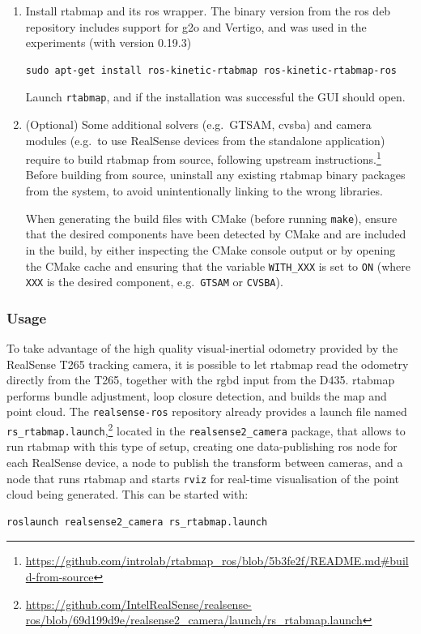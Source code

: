 \documentclass[11pt, letterpaper, twoside]{article}
\begin{document}
\begin{enumerate}
    \item Install \gls{rtabmap} and its \gls{ros} wrapper. The binary version
        from the \gls{ros} deb repository includes support for g2o and Vertigo,
        and was used in the experiments (with version 0.19.3)
\begin{Verbatim}[samepage=true]
    sudo apt-get install ros-kinetic-rtabmap ros-kinetic-rtabmap-ros
\end{Verbatim}

        Launch \texttt{rtabmap}, and if the installation was successful the GUI
        should open.

    \item (Optional) Some additional solvers (e.g.\ GTSAM, cvsba) and camera
        modules (e.g.\ to use RealSense devices from the standalone
        application) require to build \gls{rtabmap} from source, following
        upstream
        instructions.\footnote{\url{https://github.com/introlab/rtabmap_ros/blob/5b3fe2f/README.md\#build-from-source}}
        Before building from source, uninstall any existing \gls{rtabmap}
        binary packages from the system, to avoid unintentionally linking to
        the wrong libraries.

        When generating the build files with CMake (before
        running \texttt{make}), ensure that the desired components have been
        detected by CMake and are included in the build, by either inspecting
        the CMake console output or by opening the CMake cache and ensuring
        that the variable \texttt{WITH\_XXX} is set to \texttt{ON} (where
        \texttt{XXX} is the desired component, e.g.\ \texttt{GTSAM} or
        \texttt{CVSBA}).

\end{enumerate}

\subsubsection{Usage}

To take advantage of the high quality visual-inertial odometry provided by the
RealSense T265 tracking camera, it is possible to let \gls{rtabmap} read the
odometry directly from the T265, together with the \gls{rgbd} input from the
D435. \gls{rtabmap} performs bundle adjustment, loop closure detection, and
builds the map and point cloud. The \texttt{realsense-ros} repository already
provides a launch file named
\texttt{rs\_rtabmap.launch},\footnote{\url{https://github.com/IntelRealSense/realsense-ros/blob/69d199d9e/realsense2_camera/launch/rs_rtabmap.launch}}
located in the \texttt{realsense2\_camera} package, that allows to run
\gls{rtabmap} with this type of setup, creating one data-publishing \gls{ros}
node for each RealSense device, a node to publish the transform between
cameras, and a node that runs \gls{rtabmap} and starts \texttt{rviz} for
real-time visualisation of the point cloud being generated. This can be started
with:
\begin{Verbatim}[samepage=true]
    roslaunch realsense2_camera rs_rtabmap.launch
\end{Verbatim}
\end{document}
